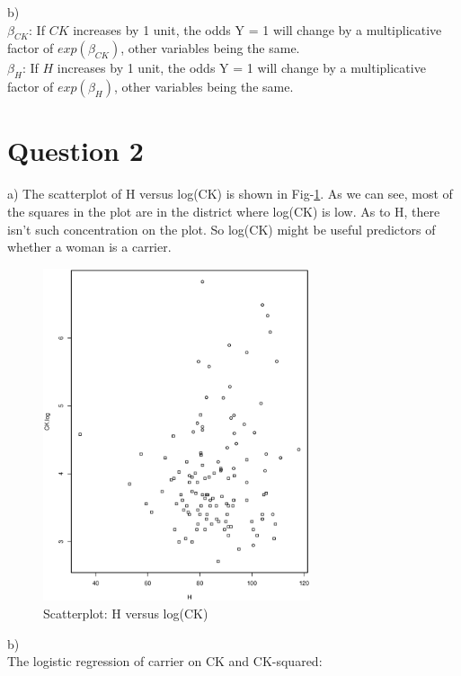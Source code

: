 \documentclass[12pt]{article}
\begin{document}
b) \\
$\beta_{CK}$: If $CK$ increases by 1 unit, the odds Y = 1 will
change by a multiplicative factor of $exp(\beta_{CK})$, other
variables being the same. \\

$\beta_H$: If $H$ increases by 1 unit, the odds Y = 1 will
change by a multiplicative factor of $exp(\beta_H)$, other
variables being the same. \\

\section*{Question 2}

a) The scatterplot of H versus log(CK) is shown in
Fig-\ref{fig:scatter}. As we can see, most of the squares in the plot
are in the district where log(CK) is low. As to H, there isn't such
concentration on the plot. So log(CK) might be useful predictors of
whether a woman is a carrier. \\

\begin{figure}[ht!]
  \centering
  \includegraphics[width=0.7\textwidth]{scatter}
  \caption{Scatterplot: H versus log(CK) \label{fig:scatter}}
\end{figure}

b) \\
The logistic regression of carrier on CK and CK-squared:
\end{document}
